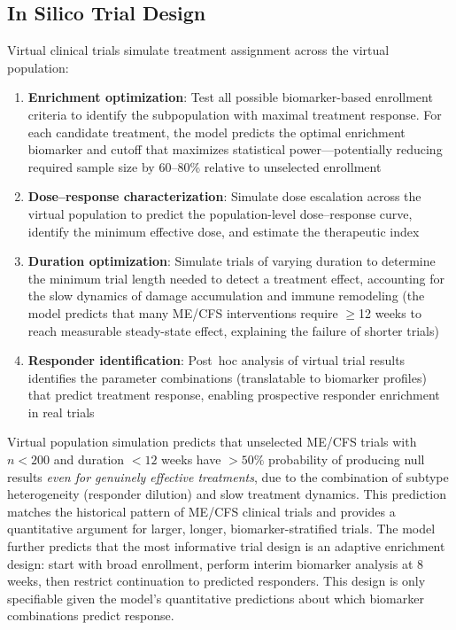 \subsection{In Silico Trial Design}

Virtual clinical trials simulate treatment assignment across the virtual population:

\begin{enumerate}
    \item \textbf{Enrichment optimization}: Test all possible biomarker-based enrollment criteria to identify the subpopulation with maximal treatment response. For each candidate treatment, the model predicts the optimal enrichment biomarker and cutoff that maximizes statistical power---potentially reducing required sample size by 60--80\% relative to unselected enrollment
    \item \textbf{Dose--response characterization}: Simulate dose escalation across the virtual population to predict the population-level dose--response curve, identify the minimum effective dose, and estimate the therapeutic index
    \item \textbf{Duration optimization}: Simulate trials of varying duration to determine the minimum trial length needed to detect a treatment effect, accounting for the slow dynamics of damage accumulation and immune remodeling (the model predicts that many ME/CFS interventions require $\geq$12 weeks to reach measurable steady-state effect, explaining the failure of shorter trials)
    \item \textbf{Responder identification}: Post~hoc analysis of virtual trial results identifies the parameter combinations (translatable to biomarker profiles) that predict treatment response, enabling prospective responder enrichment in real trials
\end{enumerate}

\begin{modelunique}
Virtual population simulation predicts that unselected ME/CFS trials with $n < 200$ and duration $< 12$ weeks have $> 50\%$ probability of producing null results \emph{even for genuinely effective treatments}, due to the combination of subtype heterogeneity (responder dilution) and slow treatment dynamics. This prediction matches the historical pattern of ME/CFS clinical trials and provides a quantitative argument for larger, longer, biomarker-stratified trials. The model further predicts that the most informative trial design is an adaptive enrichment design: start with broad enrollment, perform interim biomarker analysis at 8 weeks, then restrict continuation to predicted responders. This design is only specifiable given the model's quantitative predictions about which biomarker combinations predict response.
\end{modelunique}

